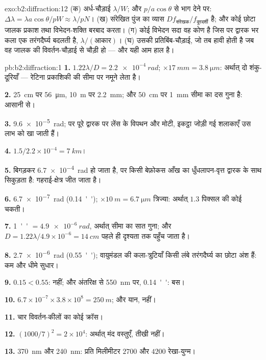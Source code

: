 \begin{solution}{exo:b2:diffraction:12}
(क) अर्ध-चौड़ाई $\lambda/W$; और $p/a\cos\theta$ से भाग देने पर: $\Delta\lambda = \lambda a\cos\theta/pW \approx
\lambda/pN$। (ख) संरेखित पुंज का व्यास $Df_{\text{संरेखक}}/f_{\text{दूरदर्शी}}$ है;
और कोई छोटा जालक प्रकाश तथा विभेदन-शक्ति बरबाद करता। (ग) कोई
विभेदन सदा वह कोण है जिस पर द्वारक भर कला
एक तरंगदैर्घ्य बदलती है, $\lambda/(\text{आकार})$। (घ) उसकी प्रतिबिंब-चौड़ाई,
जो तब हावी होती है जब वह जालक की विवर्तन-चौड़ाई से चौड़ी हो --- और
यही आम हाल है।
\end{solution}

\begin{solution}{pb:b2:diffraction:1}
\textbf{1.} $1.22\lambda/D = \qty{2.2e-4}{rad}$; $\times\qty{17}{mm} = \qty{3.8}{\micro m}$: अर्थात् दो
शंकु-दूरियाँ --- रेटिना प्रकाशिकी की सीमा पर नमूने लेता है।

\textbf{2.} \qty{25}{cm} पर \qty{56}{\micro m}, \qty{10}{m} पर \qty{2.2}{mm}; और \qty{50}{cm} पर
\qty{1}{mm} सीमा का दस गुना है: आसानी से।

\textbf{3.} \qty{9.6e-5}{rad}; पर पूरे द्वारक पर लेंस के विपथन और
मोटी, इकट्ठा जोड़ी गई शलाकाएँ उस लाभ को खा जाती हैं।

\textbf{4.} $1.5/2.2 \times 10^{-4} = \qty{7}{km}$।

\textbf{5.}  बिगड़कर \qty{6.7e-4}{rad} हो जाता है, पर किसी बेफ़ोकस आँख का
धुँधलापन-वृत्त द्वारक के साथ सिकुड़ता है: गहराई-क्षेत्र जीत जाता है।

\textbf{6.} \qty{6.7e-7}{rad} (\qty{0.14}{''}); $\times\qty{10}{m} = \qty{6.7}{\micro m}$ त्रिज्या: अर्थात्
$1.3$ पिक्सल की कोई चकती।

\textbf{7.} \qty{1}{''} $= \qty{4.9e-6}{rad}$, अर्थात् सीमा का सात गुना; और $D = 1.22\lambda/4.9
\times 10^{-6} = \qty{14}{cm}$ पहले ही दृश्यता तक पहुँच जाता है।

\textbf{8.} \qty{2.7e-6}{rad} (\qty{0.55}{''}); वायुमंडल की कला-त्रुटियाँ किसी लंबे
तरंगदैर्घ्य का छोटा अंश हैं: कम और धीमे सुधार।

\textbf{9.} $0.15 < 0.55$: नहीं; और अंतरिक्ष से \qty{550}{nm} पर, \qty{0.14}{''}: बस।

\textbf{10.} $6.7 \times 10^{-7} \times 3.8 \times 10^8 = \qty{250}{m}$; और यान, नहीं।

\textbf{11.} चार विवर्तन-कीलों का कोई क्रॉस।

\textbf{12.} $(1000/7)^2 = 2 \times 10^4$: अर्थात् मंद वस्तुएँ, तीखी नहीं।

\textbf{13.} \qty{370}{nm} और \qty{240}{nm}: प्रति मिलीमीटर $2700$ और $4200$
रेखा-युग्म।


\end{solution}
